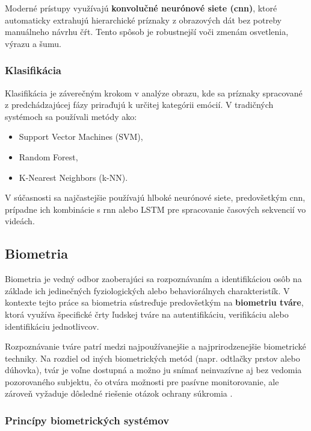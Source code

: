 Moderné prístupy využívajú \textbf{konvolučné neurónové siete (\gls{cnn})}, ktoré automaticky extrahujú hierarchické príznaky z obrazových dát bez potreby manuálneho návrhu čŕt. Tento spôsob je robustnejší voči zmenám osvetlenia, výrazu a šumu.

\subsubsection{Klasifikácia}
Klasifikácia je záverečným krokom v analýze obrazu, kde sa príznaky spracované z predchádzajúcej fázy priraďujú k určitej kategórii emócií. V tradičných systémoch sa používali metódy ako:
\begin{itemize}
    \item Support Vector Machines (SVM),
    \item Random Forest,
    \item K-Nearest Neighbors (k-NN).
\end{itemize}

V súčasnosti sa najčastejšie používajú hlboké neurónové siete, predovšetkým \gls{cnn}, prípadne ich kombinácie s \gls{rnn} alebo LSTM pre spracovanie časových sekvencií vo videách.

\subsection{Biometria}

Biometria je vedný odbor zaoberajúci sa rozpoznávaním a identifikáciou osôb na základe ich jedinečných fyziologických alebo behaviorálnych charakteristík. V kontexte tejto práce sa biometria sústreďuje predovšetkým na \textbf{biometriu tváre}, ktorá využíva špecifické črty ľudskej tváre na autentifikáciu, verifikáciu alebo identifikáciu jednotlivcov.

Rozpoznávanie tváre patrí medzi najpoužívanejšie a najprirodzenejšie biometrické techniky. Na rozdiel od iných biometrických metód (napr. odtlačky prstov alebo dúhovka), tvár je voľne dostupná a možno ju snímať neinvazívne aj bez vedomia pozorovaného subjektu, čo otvára možnosti pre pasívne monitorovanie, ale zároveň vyžaduje dôsledné riešenie otázok ochrany súkromia\cite{inProceedings01} \cite{article03}.

\subsubsection{Princípy biometrických systémov}

